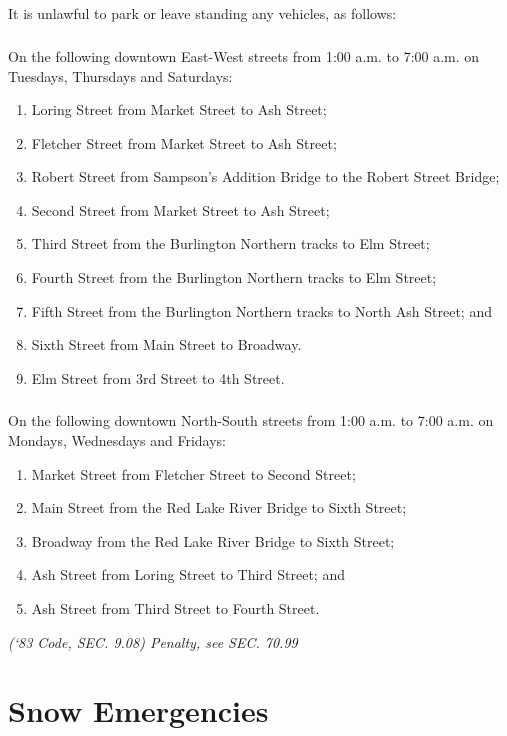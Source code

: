 \subsection{}
It is unlawful to park or leave standing any vehicles, as follows:
\subsubsection{}
On the following downtown East-West streets from 1:00 a.m. to 7:00 a.m. on Tuesdays, Thursdays and Saturdays:
\begin{enumerate}[{\indent}a)]
\item Loring Street from Market Street to Ash Street;
\item Fletcher Street from Market Street to Ash Street;
\item Robert Street from Sampson’s Addition Bridge to the Robert Street Bridge;
\item Second Street from Market Street to Ash Street;
\item Third Street from the Burlington Northern tracks to Elm Street;
\item Fourth Street from the Burlington Northern tracks to Elm Street;
\item Fifth Street from the Burlington Northern tracks to North Ash Street; and
\item Sixth Street from Main Street to Broadway.
\item Elm Street from 3rd Street to 4th Street.
\end{enumerate}
\subsubsection{}
On the following downtown North-South streets from 1:00 a.m. to 7:00 a.m. on Mondays, Wednesdays and Fridays:
\begin{enumerate}[{\indent}a)]
\item Market Street from Fletcher Street to Second Street;
\item Main Street from the Red Lake River Bridge to Sixth Street;
\item Broadway from the Red Lake River Bridge to Sixth Street;
\item Ash Street from Loring Street to Third Street; and
\item Ash Street from Third Street to Fourth Street.
\end{enumerate}
\emph{(‘83 Code, SEC. 9.08)  Penalty, see SEC. 70.99}

\section{Snow Emergencies}
